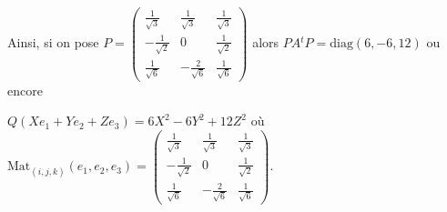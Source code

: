 {\begin{enumerate}
{Ainsi, si on pose $P=\left(
\begin{array}{ccc}
\frac{1}{\sqrt{3}}&\frac{1}{\sqrt{3}}&\frac{1}{\sqrt{3}}\\
-\frac{1}{\sqrt{2}}&0&\frac{1}{\sqrt{2}}\\
\frac{1}{\sqrt{6}}&-\frac{2}{\sqrt{6}}&\frac{1}{\sqrt{6}}
\end{array}\right)$ alors $PA{^t}P=\text{diag}(6,-6,12)$ ou encore

\begin{center}
$Q(Xe_1+Ye_2+Ze_3) =6X^2-6Y^2+12Z^2$ où $\text{Mat}_{(i,j,k)}(e_1,e_2,e_3)=\left(
\begin{array}{ccc}
\frac{1}{\sqrt{3}}&\frac{1}{\sqrt{3}}&\frac{1}{\sqrt{3}}\\
-\frac{1}{\sqrt{2}}&0&\frac{1}{\sqrt{2}}\\
\frac{1}{\sqrt{6}}&-\frac{2}{\sqrt{6}}&\frac{1}{\sqrt{6}}
\end{array}\right)$.
\end{center}}
\end{enumerate}
}
